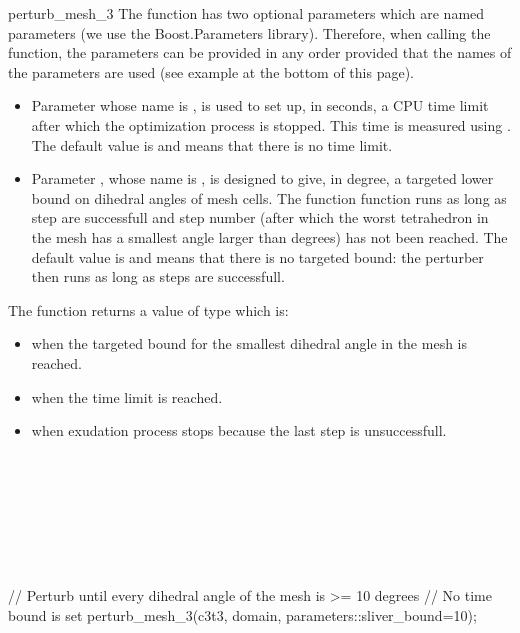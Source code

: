 \begin{ccRefFunction}{perturb_mesh_3}
The function has two optional parameters which are named parameters (we use the Boost.Parameters library). 
Therefore, when calling the function,  the parameters can be provided in any order 
provided that the names of the parameters are used
 (see example at the bottom of this page).
\begin{itemize}
\item
Parameter   whose name is ,
 is used to set up, in seconds,
 a CPU time limit after which the optimization process is stopped. This time is
 measured using .
The default value is  and means that there is no time limit.
\item 
Parameter , whose name is ,
is designed to give, in degree,  a targeted
lower bound on dihedral angles of mesh cells.
The function \ccRefName function runs as long as step are successfull
 and  step number  (after which
the worst tetrahedron in the mesh has a smallest angle larger than 
  degrees) has not been reached.
The default value is  and means that  there is no targeted bound: 
the perturber  then runs as long as
steps are successfull.
\end{itemize}




The function \ccRefName{} returns a value of type 
which is:
\begin{itemize}
\item {} when the targeted bound for the smallest dihedral angle in the mesh is reached.
\item{} when the time limit is reached.
\item {} when exudation process stops because the last step is unsuccessfull.
\end{itemize}

\ccSeeAlso

 \\
 \\
 \\
 \\
 \\
 \\


\ccExample
\begin{ccExampleCode}
// Perturb until every dihedral angle of the mesh is >= 10 degrees
// No time bound is set
perturb_mesh_3(c3t3, domain, parameters::sliver_bound=10);
\end{ccExampleCode}

\end{ccRefFunction}

\ccRefPageEnd

